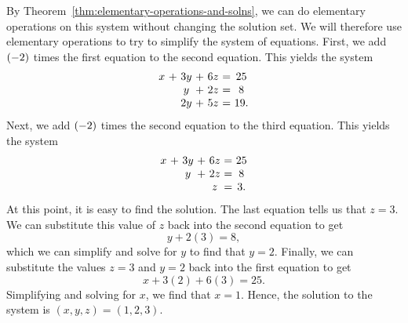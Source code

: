 \begin{solution}
  By Theorem~\ref{thm:elementary-operations-and-solns}, we can do
  elementary operations on this system without changing the solution
  set. We will therefore use elementary operations to try to simplify
  the system of equations.  First, we add $\left(-2\right)$ times the
  first equation to the second equation. This yields the system
  \begin{equation*}
    \begin{array}{c@{~}c@{~}c@{~}c@{~}c@{~}c@{~}c}
      x&+&3y&+&6z&=&25 \\
       &&y&+&2z&=&8 \\
       &&2y&+&5z&=&19.
    \end{array}
    \label{solving-a-system2}
  \end{equation*}
  Next, we add $\left(-2\right)$ times the second equation to the
  third equation. This yields the system
  \begin{equation}\label{solving-a-system3}
    \begin{array}{c@{~}c@{~}c@{~}c@{~}c@{~}c@{~}c}
      x&+&3y&+&6z&=&25 \\
      &&y&+&2z&=&8 \\
      &&&&z&=&3.
    \end{array}
  \end{equation}
  At this point, it is easy to find the solution. The last equation
  tells us that $z=3$. We can substitute this value of $z$ back into
  the second equation to get
  \begin{equation*}
    y+2(3)=8,
  \end{equation*}
  which we can simplify and solve for $y$ to find that $y=2$. Finally,
  we can substitute the values $z=3$ and $y=2$ back into the first
  equation to get
  \begin{equation*}
    x+3(2)+6(3)=25.
  \end{equation*}
  Simplifying and solving for $x$, we find that $x=1$. Hence, the
  solution to the system is $(x,y,z)=(1,2,3)$.


\end{solution}
